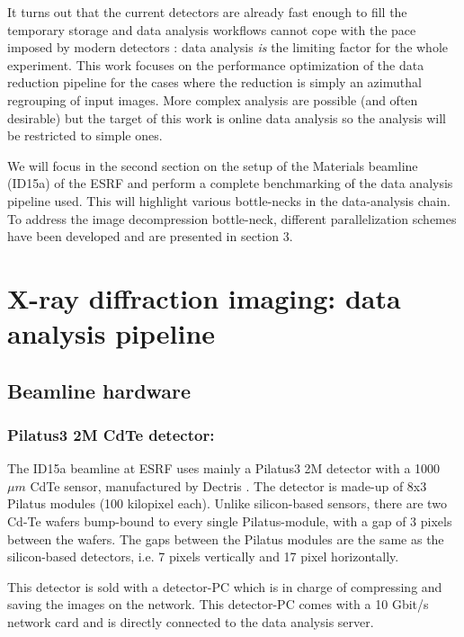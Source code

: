 \documentclass[preprint]{iucr}              %
\begin{document}
 
It turns out that the current detectors are already fast enough to fill the temporary
storage and data analysis workflows cannot cope with the pace imposed by
modern detectors \cite{GigaFRoST}: data analysis \emph{is} the limiting factor
for the whole experiment.
This work focuses on the performance optimization of the data reduction
pipeline for the cases where the reduction is simply an azimuthal
regrouping of input images.
More complex analysis are possible (and often desirable) but the target of this
work is online data analysis so the analysis will be restricted to simple ones.

We will focus in the second section on the setup of the Materials beamline
(ID15a) of the ESRF  \cite{id15a} and perform a complete benchmarking of the
data analysis pipeline used. 
This will highlight various bottle-necks in the data-analysis chain.
To address the image decompression bottle-neck, different parallelization
schemes have been developed and are presented in section 3. 

\section{X-ray diffraction imaging: data analysis pipeline}

\subsection{Beamline hardware}

\subsubsection{Pilatus3 2M CdTe detector:}

The ID15a beamline at ESRF uses mainly a Pilatus3 2M detector with a 1000 $\mu
m$ CdTe sensor, manufactured by Dectris \cite{pilatus}. 
The detector is made-up of 8x3 Pilatus modules (100 kilopixel each).
Unlike silicon-based sensors, there are two Cd-Te wafers bump-bound to every
single Pilatus-module, with a gap of 3 pixels between the wafers.
The gaps between the Pilatus modules are the same as the silicon-based
detectors, i.e. 7 pixels vertically and 17 pixel horizontally.

This detector is sold with a detector-PC which is in charge of compressing and
saving the images on the network. 
This detector-PC comes with a 10 Gbit/s network card and is directly connected
to the data analysis server.
\end{document}
